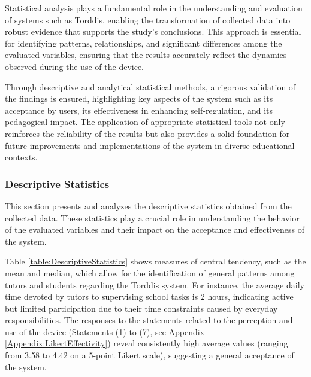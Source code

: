                 Statistical analysis plays a fundamental role in the understanding and evaluation of systems such as Torddis, enabling the transformation of collected data into robust evidence that supports the study’s conclusions. This approach is essential for identifying patterns, relationships, and significant differences among the evaluated variables, ensuring that the results accurately reflect the dynamics observed during the use of the device.
                
                Through descriptive and analytical statistical methods, a rigorous validation of the findings is ensured, highlighting key aspects of the system such as its acceptance by users, its effectiveness in enhancing self-regulation, and its pedagogical impact. The application of appropriate statistical tools not only reinforces the reliability of the results but also provides a solid foundation for future improvements and implementations of the system in diverse educational contexts.
                
                \subsubsection{Descriptive Statistics}
                This section presents and analyzes the descriptive statistics obtained from the collected data. These statistics play a crucial role in understanding the behavior of the evaluated variables and their impact on the acceptance and effectiveness of the system.
                
                Table \ref{table:DescriptiveStatistics} shows measures of central tendency, such as the mean and median, which allow for the identification of general patterns among tutors and students regarding the Torddis system. For instance, the average daily time devoted by tutors to supervising school tasks is 2 hours, indicating active but limited participation due to their time constraints caused by everyday responsibilities. The responses to the statements related to the perception and use of the device (Statements (1) to (7), see Appendix \ref{Appendix:LikertEffectivity}) reveal consistently high average values (ranging from 3.58 to 4.42 on a 5-point Likert scale), suggesting a general acceptance of the system.
                
